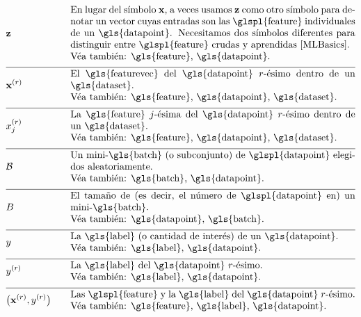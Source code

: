 \begin{align}
	&\rawfeaturevec &\quad &\parbox{.85\textwidth}{En lugar del símbolo $\featurevec$, a veces 
		usamos $\rawfeaturevec$ como otro símbolo para denotar un vector cuyas entradas 
		son las \glspl{feature} individuales de un \gls{datapoint}. Necesitamos dos 
		símbolos diferentes para distinguir entre \glspl{feature} crudas y aprendidas \cite[Ch. 9]{MLBasics}.
		\\ Véa también: \gls{feature}, \gls{datapoint}.} \nonumber \\[2mm] \hline \nonumber\\[-5mm]
	&\featurevec^{(\sampleidx)} &\quad &\parbox{.85\textwidth}{El \gls{featurevec} del \gls{datapoint} $\sampleidx$-ésimo dentro de un \gls{dataset}.
		\\ Véa también: \gls{feature}, \gls{datapoint}, \gls{dataset}.} \nonumber \\[2mm] \hline \nonumber\\[-5mm]
	&\feature_{\featureidx}^{(\sampleidx)} &\quad &\parbox{.85\textwidth}{La \gls{feature} $\featureidx$-ésima del \gls{datapoint} $\sampleidx$-ésimo 
		dentro de un \gls{dataset}.
		\\ Véa también: \gls{feature}, \gls{datapoint}, \gls{dataset}.} \nonumber \\[2mm] \hline \nonumber\\[-5mm]
	&\batch &\quad &\parbox{.85\textwidth}{Un mini-\gls{batch} (o subconjunto) de \glspl{datapoint} elegidos aleatoriamente.
		\\ Véa también: \gls{batch}, \gls{datapoint}.} \nonumber \\[2mm] \hline \nonumber\\[-5mm]
	&\batchsize &\quad &\parbox{.85\textwidth}{El tamaño de (es decir, el número de \glspl{datapoint} en) un mini-\gls{batch}.
		\\ Véa también: \gls{datapoint}, \gls{batch}.} \nonumber \\[2mm] \hline \nonumber\\[-5mm]
	&\truelabel &\quad &\parbox{.85\textwidth}{La \gls{label} (o cantidad de interés) de un \gls{datapoint}.
		\\ Véa también: \gls{label}, \gls{datapoint}.} \nonumber \\[2mm] \hline \nonumber\\[-5mm]
	&\truelabel^{(\sampleidx)} &\quad &\parbox{.85\textwidth}{La \gls{label} del \gls{datapoint} $\sampleidx$-ésimo.
		\\ Véa también: \gls{label}, \gls{datapoint}.} \nonumber \\[2mm] \hline \nonumber\\[-5mm]
	&\big(\featurevec^{(\sampleidx)},\truelabel^{(\sampleidx)}\big) &\quad &\parbox{.85\textwidth}{Las \glspl{feature} y la \gls{label} del \gls{datapoint} $\sampleidx$-ésimo.
		\\ Véa también: \gls{feature}, \gls{label}, \gls{datapoint}.} \nonumber 
\end{align}                  

